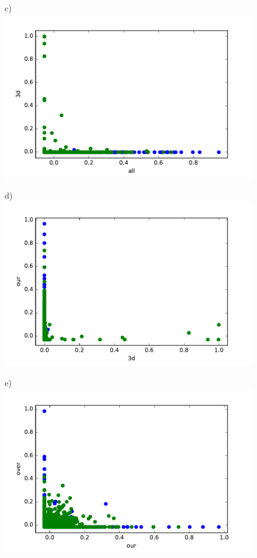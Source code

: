 \documentclass[10pt, paper=a4]{article}
\begin{document}
\begin{figure}[h]
\begin{minipage}{0.3\textwidth}
  \end{minipage} \hfill
  \begin{minipage}{0.3\textwidth}
    c)\\
    \includegraphics[width = 0.99\textwidth]{../../src/img/all_3d.pdf}
  \end{minipage} \vfill
  \begin{minipage}{0.3\textwidth}
    d)\\
    \includegraphics[width = 0.99\textwidth]{../../src/img/3d_our.pdf}
  \end{minipage} \hfill
  \begin{minipage}{0.3\textwidth}
    e)\\
    \includegraphics[width = 0.99\textwidth]{../../src/img/our_over.pdf}

\end{minipage}
\end{figure}
\end{document}
